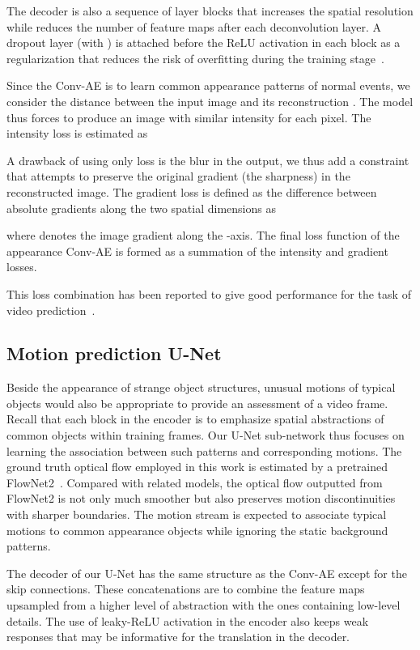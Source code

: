 \documentclass[10pt,twocolumn,letterpaper]{article}
\begin{document}
The decoder is also a sequence of layer blocks that increases the spatial resolution while reduces the number of feature maps after each deconvolution layer. A dropout layer (with ) is attached before the ReLU activation in each block as a regularization that reduces the risk of overfitting during the training stage~\cite{Srivastava2014Dropout}.

Since the Conv-AE is to learn common appearance patterns of normal events, we consider the  distance between the input image  and its reconstruction . The model thus forces to produce an image with similar intensity for each pixel. The intensity loss is estimated as

A drawback of using only  loss is the blur in the output, we thus add a constraint that attempts to preserve the original gradient (\ie the sharpness) in the reconstructed image. The gradient loss is defined as the difference between absolute gradients along the two spatial dimensions as

where  denotes the image gradient along the -axis. The final loss function of the appearance Conv-AE is formed as a summation of the intensity and gradient losses.

This loss combination has been reported to give good performance for the task of video prediction~\cite{Mathieu2015Deep,Wen2018Future}.

\subsection{Motion prediction U-Net}\label{sec:unet}
Beside the appearance of strange object structures, unusual motions of typical objects would also be appropriate to provide an assessment of a video frame. Recall that each block in the encoder is to emphasize spatial abstractions of common objects within training frames. Our U-Net sub-network thus focuses on learning the association between such patterns and corresponding motions. The ground truth optical flow employed in this work is estimated by a pretrained FlowNet2~\cite{Eddy2017Flownet2}. Compared with related models, the optical flow outputted from FlowNet2 is not only much smoother but also preserves motion discontinuities with sharper boundaries. The motion stream is expected to associate typical motions to common appearance objects while ignoring the static background patterns.

The decoder of our U-Net has the same structure as the Conv-AE except for the skip connections. These concatenations are to combine the feature maps upsampled from a higher level of abstraction with the ones containing low-level details. The use of leaky-ReLU activation in the encoder also keeps weak responses that may be informative for the translation in the decoder.
\end{document}
